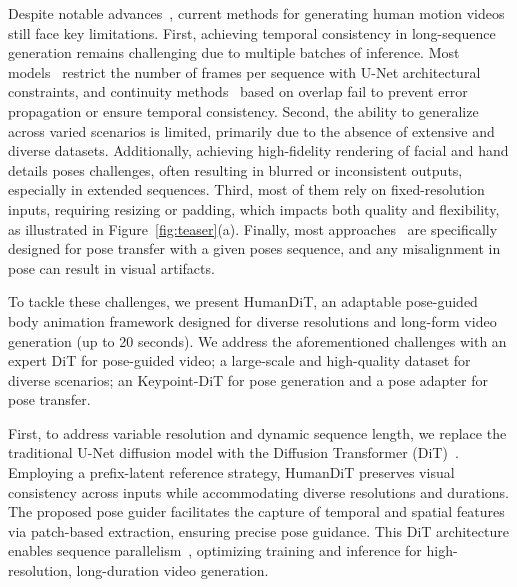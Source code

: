 Despite notable advances~\cite{hu2024animate,zhu2024champ,xue2024follow,wang2024unianimate,xu2024magicanimate,chang2023magicdance,zhang2024mimicmotion,lin2024cyberhost}, current methods for generating human motion videos still face key limitations. 
First, achieving temporal consistency in long-sequence generation remains challenging due to multiple batches of inference.  Most models~\cite{hu2024animate,xue2024follow,lin2024cyberhost,zhang2024mimicmotion} restrict the number of frames per sequence with U-Net architectural~\cite{hu2024animate} constraints, and continuity methods~\cite{zhang2024mimicmotion,wang2024unianimate} based on overlap fail to prevent error propagation or ensure temporal consistency.
Second, the ability to generalize across varied scenarios is limited, primarily due to the absence of extensive and diverse datasets. Additionally, achieving high-fidelity rendering of facial and hand details poses challenges, often resulting in blurred or inconsistent outputs, especially in extended sequences. 
Third, most of them rely on fixed-resolution inputs, requiring resizing or padding, which impacts both quality and flexibility, as illustrated in Figure~\ref{fig:teaser}(a). 
Finally, most approaches~\cite{wang2024disco,hu2024animate,zhang2024mimicmotion,xue2024follow} are specifically designed for pose transfer with a given poses sequence, and any misalignment in pose can result in visual artifacts.

To tackle these challenges, we present HumanDiT, an adaptable pose-guided body animation framework designed for diverse resolutions and long-form video generation (up to 20 seconds). We address the aforementioned challenges with an expert DiT for pose-guided video; a large-scale and high-quality dataset for diverse scenarios; an Keypoint-DiT for pose generation and a pose adapter for pose transfer.

First, to address variable resolution and dynamic sequence length, we replace the traditional U-Net diffusion model with the Diffusion Transformer (DiT)~\cite{peebles2023scalable}. Employing a prefix-latent reference strategy, HumanDiT preserves visual consistency across inputs while accommodating diverse resolutions and durations. The proposed pose guider facilitates the capture of temporal and spatial features via patch-based extraction, ensuring precise pose guidance. This DiT architecture enables sequence parallelism~\cite{li2021sequence}, optimizing training and inference for high-resolution, long-duration video generation.

